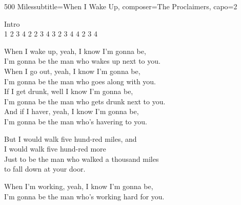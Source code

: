 \begin{song}{500 Miles}{subtitle={When I Wake Up}, composer={The Proclaimers}, capo={2}}

Intro \\
 1 2 3 4     2 2 3 4     3 2 3 4     4 2 3 4 \\

\begin{songVerse}
When I wake up, yeah, I know I'm gonna be, \\
I'm gonna be the man who wakes up next to you. \\

When I go out, yeah, I know I'm gonna be, \\
I'm gonna be the man who goes along with you. \\

If I get drunk, well I know I'm gonna be, \\
I'm gonna be the man who gets drunk next to you. \\

And if I haver, yeah, I know I'm gonna be, \\
I'm gonna be the man who's havering to you. \\
\end{songVerse}

\begin{songChorus}
But I would walk  five hund-red miles, and \\
I    would     walk    five hund-red    more \\
Just to be the man who walked a thousand miles \\
to fall down at your door.     \\
\end{songChorus}

\begin{songVerse}
When I'm working, yeah, I know I'm gonna be, \\
I'm gonna be the man who's working hard for you. \\


\end{songVerse}
\end{song}

